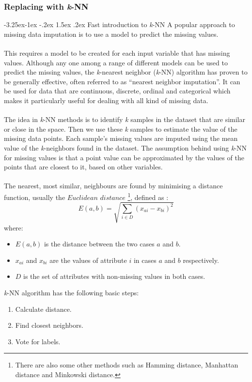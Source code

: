 \documentclass[a4paper]{article}
\makeatletter
\newcounter {subsubsubsection}[subsubsection]
\newcommand\subsubsubsection{\@startsection{subsubsubsection}{4}{\z@}%
                                     {-3.25ex\@plus -1ex \@minus -.2ex}%
                                     {1.5ex \@plus .2ex}%
                                     {\normalfont\normalsize\bfseries}}
\makeatother
\begin{document}
\subsubsection{Replacing with \textit{k}-NN}
\subsubsubsection{Fast introduction to \textit{k}-NN}
A popular approach to missing data imputation is to use a model to predict the missing values.\\\\
This requires a model to be created for each input variable that has missing values. Although any one among a range of different models can be used to predict the missing values, the \textit{k}-nearest neighbor (\textit{k}-NN) algorithm has proven to be generally effective, often referred to as “nearest neighbor imputation”. It can be used for data that are continuous, discrete, ordinal and categorical which makes it particularly useful for dealing with all kind of missing data.\\\\
The idea in \textit{k}-NN methods is to identify \textit{k} samples in the dataset that are similar or close in the space. Then we use these \textit{k} samples to estimate the value of the missing data points. Each sample’s missing values are imputed using the mean value of the \textit{k}-neighbors found in the dataset. The assumption behind using \textit{k}-NN for missing values is that a point value can be approximated by the values of the points that are closest to it, based on other variables.\\\\
The nearest, most similar, neighbours are found by minimising a distance function, usually the $Euclidean$ $distance$ \footnote{There are also some other methods such as Hamming distance, Manhattan distance and Minkowski distance.}\:, defined as \cite{bib5}:
\begin{equation*}
    E(a,b) = \sqrt{\sum_{i \in D}(x_{ai} - x_{bi})^2} 
\end{equation*}
where:
\begin{itemize}
    \item $E(a, b)$ is the distance between the two cases $a$ and $b$.
    \item $x_{ai}$ and $x_{bi}$ are the values of attribute $i$ in cases $a$ and $b$ respectively.
    \item $D$ is the set of attributes with non-missing values in both cases.
\end{itemize}
\textit{k}-NN algorithm has the following basic steps:
\begin{enumerate}
    \item Calculate distance.
    \item Find closest neighbors.
    \item Vote for labels.
\end{enumerate}
\end{document}
